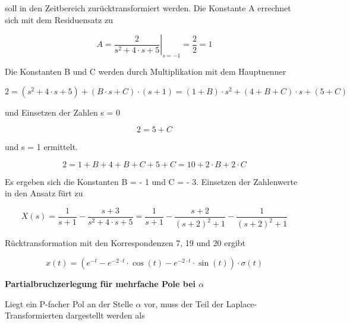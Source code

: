 \noindent soll in den Zeitbereich zurücktransformiert werden. Die Konstante A errechnet sich mit dem Residuensatz zu

\begin{equation}\label{eq:fourhundredsthirtysix}
A=\left. \frac{2}{s^{2} +4\cdot s+5} \right|_{s=-1} =\frac{2}{2} =1
\end{equation}

\noindent Die Konstanten B und C werden durch Multiplikation mit dem Hauptnenner 

\begin{equation}\label{eq:fourhundredsthirtyseven}
2=\left(s^{2} +4\cdot s+5\right)+\left(B\cdot s+C\right)\cdot \left(s+1\right)=\left(1+B\right)\cdot s^{2} +\left(4+B+C\right)\cdot s+\left(5+C\right)
\end{equation}

\noindent und Einsetzen der Zahlen s = 0 

\begin{equation}\label{eq:fourhundredsthirtyeight}
2=5+C
\end{equation}

\noindent und s = 1 ermittelt.

\begin{equation}\label{eq:fourhundredsthirtynine}
2=1+B+4+B+C+5+C=10+2\cdot B+2\cdot C
\end{equation}

\noindent Es ergeben sich die Konstanten B = - 1 und C = - 3. Einsetzen der Zahlenwerte in den Ansatz fürt zu

\begin{equation}\label{eq:fourhundredsfourty}
X\left(s\right)=\frac{1}{s+1} -\frac{s+3}{s^{2} +4\cdot s+5} =\frac{1}{s+1} -\frac{s+2}{\left(s+2\right)^{2} +1} -\frac{1}{\left(s+2\right)^{2} +1}
\end{equation}

\noindent Rücktransformation mit den Korrespondenzen 7, 19 und 20 ergibt

\begin{equation}\label{eq:fourhundredsfourtyone}
x\left(t\right)=\left(e^{-t} -e^{-2\cdot t} \cdot \cos \left(t\right)-e^{-2\cdot t} \cdot \sin \left(t\right)\right)\cdot \sigma \left(t\right)
\end{equation}\medskip

{\selectfont
\noindent\textbf{Partialbruchzerlegung für mehrfache Pole bei $\alpha$}}\smallskip

\noindent Liegt ein P-facher Pol an der Stelle $\alpha$ vor, muss der Teil der Laplace-Transformierten dargestellt werden als

